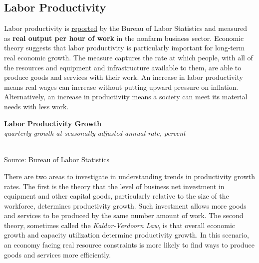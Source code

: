 \documentclass{report}
\makeatletter
\newcommand{\tbllink}[1]{\href{https://raw.githubusercontent.com/bdecon/US-chartbook/master/chartbook/data/#1}{\faTable}}
\newcommand*\short[1]{\expandafter\@gobbletwo\number\numexpr#1\relax}
\newcommand{\sbar}[4]{
		\addplot[ybar stacked, bar width=2.6pt, draw opacity=0, fill=#1] 
			table [x=#2, y=#3, col sep=comma]{#4};}
\newcommand{\dateaxisticks}{
		date coordinates in=x, axis line style={draw=none},
		xmax={2020-05-10},
		max space between ticks=40,	    
		xtick={{1990-01-01}, {1992-01-01}, {1994-01-01}, 
			{1996-01-01}, {1998-01-01}, {2000-01-01}, 
			{2002-01-01}, {2004-01-01}, {2006-01-01},
			{2008-01-01}, {2010-01-01}, {2012-01-01}, {2014-01-01},
		    {2016-01-01}, {2018-01-01}, {2020-01-01}},
		minor xtick={{1989-01-01}, {1991-01-01}, {1993-01-01},
			{1995-01-01}, {1997-01-01}, {1999-01-01}, 
			{2001-01-01}, {2003-01-01}, {2005-01-01}, {2007-01-01},
		    {2009-01-01}, {2011-01-01}, {2013-01-01}, {2015-01-01},
		    {2017-01-01}, {2019-01-01}},
		enlarge y limits={0.06}, enlarge x limits={0.01},
		}
\newcommand{\bbar}[2]{extra #1 ticks = {{#2}}, extra #1 tick labels = ,
		extra #1 tick style = {grid=major, grid style={thick, black!25}},}
\newcommand{\rbars}{
		\fill[color=black!10] (axis cs:{1990-07-01},\pgfkeysvalueof{/pgfplots/ymin}) rectangle 
			(axis cs:{1991-03-01}, \pgfkeysvalueof{/pgfplots/ymax});
		\fill[color=black!10] (axis cs:{2007-12-01},\pgfkeysvalueof{/pgfplots/ymin}) rectangle 
			(axis cs:{2009-07-01}, \pgfkeysvalueof{/pgfplots/ymax});
		\fill[color=black!10] (axis cs:{2001-03-01},\pgfkeysvalueof{/pgfplots/ymin}) rectangle 
			(axis cs:{2001-11-01}, \pgfkeysvalueof{/pgfplots/ymax});}
\makeatother
\begin{document}
{{{{{{{{{\begin{minipage}{0.76\textwidth}
\subsection*{\color{black!70} \seriffont Labor Productivity}

\small Labor productivity is \href{https://www.bls.gov/news.release/prod2.nr0.htm}{reported} by the Bureau of Labor Statistics and measured as \textbf{real output per hour of work} in the nonfarm business sector. Economic theory suggests that labor productivity is particularly important for long-term real economic growth. The measure captures the rate at which people, with all of the resources and equipment and infrastructure available to them, are able to produce goods and services with their work. An increase in labor productivity means real wages can increase without putting upward pressure on inflation. Alternatively, an increase in productivity means a society can meet its material needs with less work.\\


\vspace{5mm}

\noindent \normalsize \textbf{Labor Productivity Growth}\\
\footnotesize{\textit{quarterly growth at seasonally adjusted annual rate, percent}}\\
\noindent \hspace*{-2mm} \\
\footnotesize{Source: Bureau of Labor Statistics} \hfill \tbllink{lprod.csv}\\

\vspace{3mm}

\small There are two areas to investigate in understanding trends in productivity growth rates. The first is the theory that the level of business net investment in equipment and other capital goods, particularly relative to the size of the workforce, determines productivity growth. Such investment allows more goods and services to be produced by the same number amount of work. The second theory, sometimes called the \textit{Kaldor-Verdoorn Law}, is that overall economic growth and capacity utilization determine productivity growth. In this scenario, an economy facing real resource constraints is more likely to find ways to produce goods and services more efficiently.\\



\end{minipage}}}}}}}}}}
\end{document}
